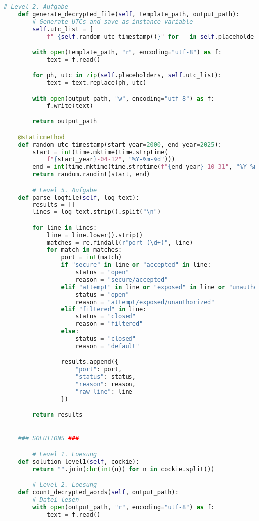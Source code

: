 \documentclass[a4paper 11pt]{article}
\begin{document}
\begin{lstlisting}[language=python, caption=der Raum]
        # Level 2. Aufgabe
    def generate_decrypted_file(self, template_path, output_path):
        # Generate UTCs and save as instance variable
        self.utc_list = [
            f"-{self.random_utc_timestamp()}" for _ in self.placeholders]

        with open(template_path, "r", encoding="utf-8") as f:
            text = f.read()

        for ph, utc in zip(self.placeholders, self.utc_list):
            text = text.replace(ph, utc)

        with open(output_path, "w", encoding="utf-8") as f:
            f.write(text)

        return output_path

    @staticmethod
    def random_utc_timestamp(start_year=2000, end_year=2025):
        start = int(time.mktime(time.strptime(
            f"{start_year}-04-12", "%Y-%m-%d")))
        end = int(time.mktime(time.strptime(f"{end_year}-10-31", "%Y-%m-%d")))
        return random.randint(start, end)

		# Level 5. Aufgabe
    def parse_logfile(self, log_text):
        results = []
        lines = log_text.strip().split("\n")

        for line in lines:
            line = line.lower().strip()
            matches = re.findall(r"port (\d+)", line)
            for match in matches:
                port = int(match)
                if "secure" in line or "accepted" in line:
                    status = "open"
                    reason = "secure/accepted"
                elif "attempt" in line or "exposed" in line or "unauthorized" in line:
                    status = "open"
                    reason = "attempt/exposed/unauthorized"
                elif "filtered" in line:
                    status = "closed"
                    reason = "filtered"
                else:
                    status = "closed"
                    reason = "default"

                results.append({
                    "port": port,
                    "status": status,
                    "reason": reason,
                    "raw_line": line
                })

        return results


    ### SOLUTIONS ###

        # Level 1. Loesung
    def solution_level1(self, cockie):
        return "".join(chr(int(n)) for n in cockie.split())

        # Level 2. Loesung
    def count_decrypted_words(self, output_path):
        # Datei lesen
        with open(output_path, "r", encoding="utf-8") as f:
            text = f.read()


\end{lstlisting}
\end{document}
